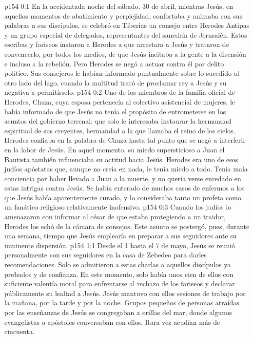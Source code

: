 \author{Comisión de seres intermedios}
\vs p154 0:1 En la accidentada noche del sábado, 30 de abril, mientras Jesús, en aquellos momentos de abatimiento y perplejidad, confortaba y animaba con sus palabras a sus discípulos, se celebró en Tiberias un consejo entre Herodes Antipas y un grupo especial de delegados, representantes del sanedrín de Jerusalén. Estos escribas y fariseos instaron a Herodes a que arrestara a Jesús y trataron de convencerlo, por todos los medios, de que Jesús incitaba a la gente a la disensión e incluso a la rebelión. Pero Herodes se negó a actuar contra él por delito político. Sus consejeros le habían informado puntualmente sobre lo sucedido al otro lado del lago, cuando la multitud trató de proclamar rey a Jesús y su negativa a permitírselo.
\vs p154 0:2 Uno de los miembros de la familia oficial de Herodes, Chuza, cuya esposa pertenecía al colectivo asistencial de mujeres, le había informado de que Jesús no tenía el propósito de entrometerse en los asuntos del gobierno terrenal; que solo le interesaba instaurar la hermandad espiritual de sus creyentes, hermandad a la que llamaba el reino de los cielos. Herodes confiaba en la palabra de Chuza hasta tal punto que se negó a interferir en la labor de Jesús. En aquel momento, su miedo supersticioso a Juan el Bautista también influenciaba su actitud hacia Jesús. Herodes era uno de esos judíos apóstatas que, aunque no creía en nada, le tenía miedo a todo. Tenía mala conciencia por haber llevado a Juan a la muerte, y no quería verse enredado en estas intrigas contra Jesús. Se había enterado de muchos casos de enfermos a los que Jesús había aparentemente curado, y lo consideraba tanto un profeta como un fanático religioso relativamente inofensivo.
\vs p154 0:3 Cuando los judíos lo amenazaron con informar al césar de que estaba protegiendo a un traidor, Herodes los echó de la cámara de consejos. Este asunto se postergó, pues, durante una semana, tiempo que Jesús emplearía en preparar a sus seguidores ante su inminente dispersión.
\vs p154 1:1 Desde el 1 hasta el 7 de mayo, Jesús se reunió personalmente con sus seguidores en la casa de Zebedeo para darles recomendaciones. Solo se admitieron a estas charlas a aquellos discípulos ya probados y de confianza. En este momento, solo había unos cien de ellos con suficiente valentía moral para enfrentarse al rechazo de los fariseos y declarar públicamente su lealtad a Jesús. Jesús mantuvo con ellos sesiones de trabajo por la mañana, por la tarde y por la noche. Grupos pequeños de personas atraídas por las enseñanzas de Jesús se congregaban a orillas del mar, donde algunos evangelistas o apóstoles conversaban con ellos. Rara vez acudían más de cincuenta.

